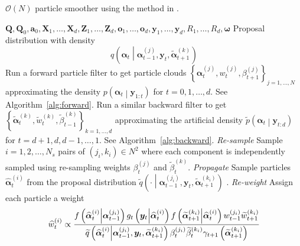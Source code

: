\documentclass[notitlepage]{article}
\newcommand\StateXX{\Statex\hspace{\algorithmicindent}\hspace{\algorithmicindent}}
\renewcommand{\vec}[1]{\bm{#1}}
\newcommand{\mat}[1]{\mathbf{#1}}
\newcommand{\Lbrace}[1]{\left\{ #1\right\}}
\newcommand{\Lparen}[1]{\left( #1\right)}
\newcommand{\Cond}[2]{ #1 \middle\vert  #2}
\newcommand{\optor}[2]{#1\Lparen{#2}}
\newcommand{\optorC}[3]{\optor{#1}{\Cond{#2}{#3}}}
\newcommand{\pdensC}[2]{\optorC{p}{#1}{#2}}
\newcommand{\pdenstC}[2]{\optorC{\widetilde p}{#1}{#2}}
\newcommand{\gFunc}[3]{\optorC{g_{#3}}{#1}{#2}}
\newcommand{\fFunc}[2]{\optorC{f}{#1}{#2}}
\newcommand{\IDC}[2]{\optorC{q}{#1}{#2}}
\newcommand{\IDAproxC}[2]{\optorC{\widetilde{q}}{#1}{#2}}
\newcommand{\partic}[3]{#1_{#2}^{\Lparen{#3}}}
\newcommand{\particB}[3]{\widetilde{#1}_{#2}^{\Lparen{#3}}}
\newcommand{\particS}[3]{\widehat{#1}_{#2}^{\Lparen{#3}}}
\newcommand{\bigO}[1]{\mathcal{O}\Lparen{#1}}
\newcommand{\nPart}{N}
\newcommand{\nPeriods}{d}
\begin{document}
\newpage

\begin{algorithm}[H]
\caption{$\bigO{\nPart}$ particle smoother using the method in \cite{fearnhead10}.}\label{alg:ONsmoother}
\begin{algorithmic}[1]\raggedright
\INPUT
\Statex $
	\mat{Q},\mat{Q}_0,\vec{a}_0,
	\mat{X}_1,\dots,\mat{X}_d,
	\mat{Z}_1,\dots,\mat{Z}_d,
	\vec o_1,\dots,\vec o_d,
	\vec{y}_1,\dots,\vec{y}_d,
	R_1,\dots,R_d,\vec{\omega}$
%
\Statex Proposal distribution with density
\Statex \begin{equation}
	\IDC{\vec{\alpha}_t}{\partic{\vec{\alpha}}{t-1}{j},\vec{y}_t, \particB{\vec{\alpha}}{t+1}{k}}
\end{equation}
%
\State Run a forward particle filter to get particle clouds %
	$\Lbrace{\partic{\vec{\alpha}}{t}{j}, \partic{w}{t}{j}, \partic{\beta}{t + 1}{j}}_{j=1,\dots,\nPart}$ %
	approximating the density $\pdensC{\vec{\alpha}_t}{\vec{y}_{1:t}}$ for $t = 0, 1, \dots, \nPeriods$. See Algorithm~\ref{alg:forward}.
\EndProcedure
%
\State Run a similar backward filter to get %
	$\Lbrace{\particB{\vec{\alpha}}{t}{k}, \particB{w}{t}{k}, \particB{\beta}{t - 1}{k}}_{k=1,\dots,\nPeriods}$  %
	approximating the artificial density $\pdenstC{\vec{\alpha}_t}{\vec{y}_{t:\nPeriods}}$ for $t = \nPeriods + 1, \nPeriods, \nPeriods - 1, \dots, 1$. See Algorithm~\ref{alg:backward}.
\EndProcedure
%
\For{$t=1,\dots, \nPeriods$}
\StateXX \emph{Re-sample}
\State Sample $i=1,2,\dots,\nPart_s$ pairs of $\Lparen{j_i, k_i}\in\nPart^2$ where each component 
is independently sampled using re-sampling weights $\partic{\beta}{t}{j}$ and $\particB{\beta}{t}{k}$.
%
\StateXX \emph{Propagate}
\State Sample particles $\particS{\vec{\alpha}}{t}{i}$ from the proposal distribution %
	$\IDAproxC{\cdot}{\partic{\vec{\alpha}}{t-1}{j_i},\vec{y}_t, \particB{\vec{\alpha}}{t + 1}{k_i}}$%
.%
\StateXX \emph{Re-weight}
\State Assign each particle a weight
\StateXX \begin{equation}\label{eqn:combineWeight}
 \particS{w}{t}{i} \propto \frac{
 	\fFunc{\particS{\vec{\alpha}}{t}{i}}{\partic{\vec{\alpha}}{t - 1}{j_i}}
 	\gFunc{\vec{y}_t}{\particS{\vec{\alpha}}{t}{i}}{t}
 	\fFunc{\particB{\vec{\alpha}}{t + 1}{k_i}}{\particS{\vec{\alpha}}{t}{i}}
 	\partic{w}{t - 1}{j_i}\particB{w}{t + 1}{k_i}
 	}{ %
 	\IDAproxC{\particS{\vec{\alpha}}{t}{i}}{\partic{\vec{\alpha}}{t-1}{j_i},\vec{y}_t, \particB{\vec{\alpha}}{t+1}{k_i}}
 	\partic{\beta}{t}{j_i}\particB{\beta}{t}{k_i}\gamma_{t +1}\Lparen{\particB{\vec{\alpha}}{t+1}{k_i}}
 	} %
\end{equation}
\EndFor
\EndProcedure
\end{algorithmic}
\end{algorithm}
\end{document}
